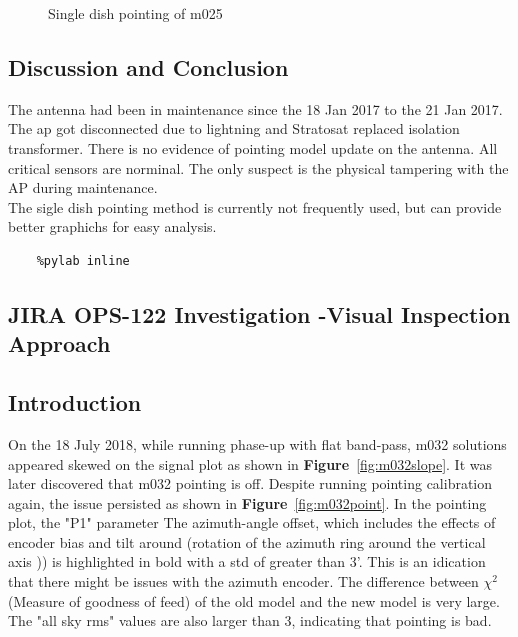 \documentclass{article}
\begin{document}
{\begin{appendices}
\begin{itemize}
\begin{figure}[H]
	  	\caption{Single dish pointing of m025}
	  	\label{fig:tilt1}
	  \end{figure}
	  
	  
	  \subsection{Discussion and Conclusion}
	  The antenna had been in maintenance since the 18 Jan 2017 to the 21 Jan 2017.  The ap got disconnected due to lightning and Stratosat replaced isolation transformer. There is no evidence of pointing model update on the antenna.  All critical sensors are norminal.  The only suspect is the physical tampering with the AP during maintenance. \\
	  The  sigle dish pointing method is currently not frequently used, but can provide better graphichs for easy analysis. 
	  
	  
	  
\end{itemize}	  
	  
	\begin{verbatim}
	%pylab inline

	\end{verbatim}
	
\end{appendices}
\begin{appendices}
	\section{JIRA OPS-122 Investigation -Visual Inspection Approach }\label{sec.py2}
\subsection{Introduction}
On the 18 July 2018, while running phase-up with flat band-pass, m032 solutions appeared skewed on the signal plot as shown in \textbf{Figure}~\ref{fig:m032slope}. It was later discovered that m032 pointing is off. Despite running pointing calibration again, the issue persisted as shown in \textbf{Figure}~\ref{fig:m032point}.  In the pointing plot, the "P1" parameter The azimuth-angle offset, which includes the effects of encoder bias and tilt around (rotation of the azimuth ring around the vertical axis )) is highlighted in bold with a std of greater than 3'. This is an idication that there might be issues with the azimuth encoder.  The difference between $\chi^2$ (Measure of goodness of feed)  of the old model and the new model is very large. The "all sky rms" values are also larger than 3, indicating that pointing is bad.
	

\end{appendices}}
\end{document}
